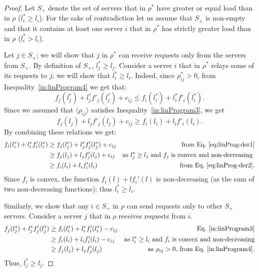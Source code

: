 \documentclass[11pt]{article}
\begin{document}
\begin{proof}
Let $S_{+}$ denote the set of servers that in $\rho^{*}$ have greater or equal load than in $\rho$ ($l_i^{*} \geq l_i$). For the sake of contradiction let us assume that $S_{+}$ is non-empty and that it contains at least one server $i$ that in $\rho^{*}$ has strictly greater load than in $\rho$ ($l_i^{*} > l_i$).

Let $j \in S_{+}$; we will show that $j$ in $\rho^{*}$ can receive requests only from the servers from $S_{+}$.
By definition of $S_+$, $l_j^{*} \geq l_j$. Consider a server $i$ that in $\rho^{*}$ relays some of its requests to $j$; we will show that $l_i^{*} \geq l_i$. Indeed, since $\rho^{*}_{ij} > 0$, from Inequality~\ref{in:linProgram4} we get that:
\begin{equation}\label{eq:linProg-der1}
f_{j}(l^{*}_j) + l^{*}_jf'_{j}(l^{*}_j) + c_{ij} \leq f_{i}(l^{*}_i) + l^{*}_if'_{i}(l^{*}_i) \text{.}
\end{equation}
Since we assumed that $\langle \rho_{ij} \rangle$ satisfies Inequality~\ref{in:linProgram3}, we get
\begin{equation}\label{eq:linProg-der2}
f_{j}(l_j) + l_jf'_{j}(l_j)+ c_{ij} \geq f_{i}(l_i) + l_if'_{i}(l_i) \text{.}
\end{equation}
By combining these relations we get:
\begin{align*}
f_{i}(l^{*}_i) + l^{*}_if'_{i}(l^{*}_i) & \geq f_{j}(l^{*}_j) + l^{*}_jf'_{j}(l^{*}_j) + c_{ij} & \text{from Eq.~\ref{eq:linProg-der1}}\\
                                        & \geq f_{j}(l_j) + l_jf'_{j}(l_j) + c_{ij} & \text{as $l^*_j \geq l_j$ and $f_j$ is convex and non-decreasing }\\
                                        & \geq f_{i}(l_i) + l_if'_{i}(l_i) & \textrm{from Eq.~\ref{eq:linProg-der2}.}
\end{align*}
Since $f_i$ is convex, the function $f_i(l) + lf_i'(l)$ is non-decreasing (as the sum of two non-decreasing functions); thus $l_i^{*} \geq l_i$.

Similarly, we show that any $i \in S_{+}$ in $\rho$ can send requests only to other $S_+$ servers. 
Consider a server $j$ that in $\rho$ receives requests from $i$. 
\begin{align*}
f_{j}(l^{*}_j) + l^{*}_jf'_{j}(l^{*}_j) & \geq f_{i}(l^{*}_i) + l^{*}_if'_{i}(l^{*}_i) - c_{ij} & \text{Eq.~\ref{in:linProgram3}}\\
                                        & \geq f_{i}(l_i) + l_if'_{i}(l_i) - c_{ij} & \text{as $l^*_i \geq l_i$ and $f_i$ is convex and non-decreasing} \\
                                        & \geq f_{j}(l_j) + l_jf'_{j}(l_j) & \textrm{as $\rho_{ij}>0$, from Eq.~\ref{in:linProgram4}.}
\end{align*}
Thus, $l_j^{*} \geq l_j$.


\end{proof}
\end{document}
